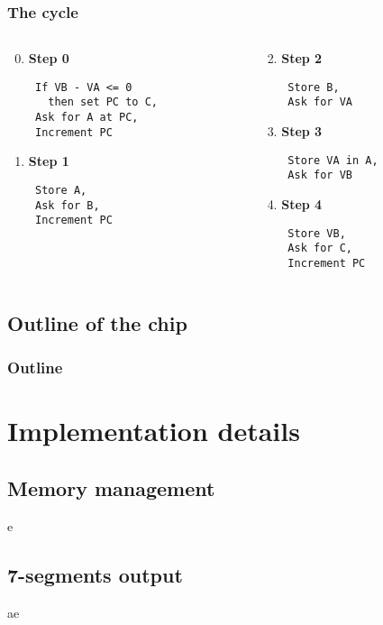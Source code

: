 \documentclass[slidestop]{beamer}
\begin{document}
\begin{frame}[fragile]
    \frametitle{The cycle}

    \begin{columns}[t]
        \begin{column}[T]{5cm}
    \begin{enumerate}
            \setcounter{enumi}{-1}
        \item \textbf{Step 0}
            \begin{lstlisting}
 If VB - VA <= 0
   then set PC to C,
 Ask for A at PC,
 Increment PC
             \end{lstlisting}

        \item \textbf{Step 1}
            \begin{lstlisting}
 Store A,
 Ask for B,
 Increment PC
            \end{lstlisting}
    \end{enumerate}
\end{column}
\begin{column}[T]{5cm}
    \begin{enumerate}
        \setcounter{enumi}{1}
        \item \textbf{Step 2}
            \begin{lstlisting}
 Store B,
 Ask for VA
            \end{lstlisting}

        \item \textbf{Step 3}
            \begin{lstlisting}
 Store VA in A,
 Ask for VB
            \end{lstlisting}

        \item \textbf{Step 4}
            \begin{lstlisting}
 Store VB,
 Ask for C,
 Increment PC
            \end{lstlisting}
    \end{enumerate}
\end{column}
\end{columns}

\end{frame}

\subsection{Outline of the chip}
\begin{frame}
    \frametitle{Outline}
    
\end{frame}

\section{Implementation details}

\subsection{Memory management}

\begin{frame}
e
\end{frame}

\subsection{7-segments output}

\begin{frame}
ae
\end{frame}
\end{document}

